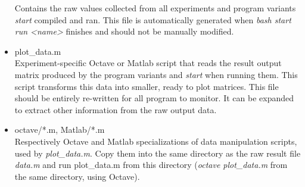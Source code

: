 \begin{itemize}
Contains the raw values collected from all experiments and program variants \emph{start} compiled and ran. This file is automatically generated when \emph{bash start run <name>} finishes and should not be manually modified.
\item plot\_data.m\\
Experiment-specific Octave or Matlab script that reads the result output matrix produced by the program variants and \emph{start} when running them. This script transforms this data into smaller, ready to plot matrices. This file should be entirely re-written for all program to monitor. It can be expanded to extract other information from the raw output data.
\item octave/*.m, Matlab/*.m\\
Respectively Octave and Matlab specializations of data manipulation scripts, used by \emph{plot\_data.m}. Copy them into the same directory as the raw result file \emph{data.m} and run plot\_data.m from this directory (\emph{octave plot\_data.m} from the same directory, using Octave).
\end{itemize}

